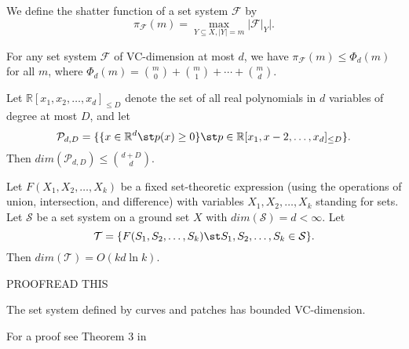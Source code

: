 \begin{definition}
	We define the shatter function of a set system \(\mathcal{F}\) by
	\begin{displaymath}
		\pi_\mathcal{F}(m) = \max_{Y\subseteq X, \lvert Y \rvert = m} \lvert \mathcal{F}|_Y
		\rvert.
	\end{displaymath}
\end{definition}

\begin{lemma}
	For any set system \(\mathcal{F}\) of VC-dimension at most \(d\), we have
		\(\pi_\mathcal{F}(m)
		\le \Phi_d(m)\) for all \(m\), where \(\Phi_d(m) = \binom{m}{0} +
		\binom{m}{1} + \cdots + \binom{m}{d}\).
\end{lemma}

\begin{proposition}
	Let \(\mathbb{R}[x_1,x_2,\ldots,x_d]_{\le D}\) denote the set of all real
	polynomials in \(d\) variables of degree at most \(D\), and let
	\begin{displaymath}
		\mathcal{P}_{d,D} = \{\{x\in \mathbb{R}^d \st p(x) \ge 0\}\st p \in
		\mathbb{R}[x_1,x-2,\ldots,x_d]_{\le D}\}.
	\end{displaymath}
	Then \(dim(\mathcal{P}_{d,D}) \le \binom{d+D}{d}\).
\end{proposition}

\begin{proposition}
	Let \(F(X_1,X_2,\ldots,X_k)\) be a fixed set-theoretic expression (using
	the operations of union, intersection, and difference) with variables
	\(X_1,X_2,\ldots,X_k\) standing for sets.
	Let \(\mathcal{S}\) be a set system on a ground set \(X\) with
	\(dim(\mathcal{S}) = d <
	\infty\). Let
	\begin{displaymath}
		\mathcal{T} = \{F(S_1,S_2,\ldots,S_k) \st S_1,S_2,\ldots,S_k \in
		\mathcal{S}\}.
	\end{displaymath}
	Then \(dim(\mathcal{T}) = O(kd\ln k)\).
\end{proposition}

PROOFREAD THIS
\begin{lemma}
\label{lem:vcdim}
The set system defined by curves and patches has bounded VC-dimension.
\end{lemma}
For a proof see Theorem 3 in \cite{MP15}

